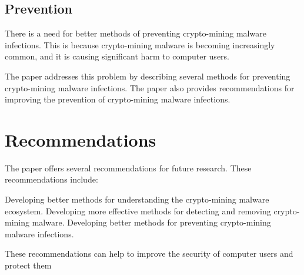 \documentclass[sigconf]{acmart}
\begin{document}
\subsection{Prevention}

There is a need for better methods of preventing crypto-mining malware infections. This is because crypto-mining malware is becoming increasingly common, and it is causing significant harm to computer users.

The paper addresses this problem by describing several methods for preventing crypto-mining malware infections. The paper also provides recommendations for improving the prevention of crypto-mining malware infections.

\section{Recommendations}

The paper offers several recommendations for future research. These recommendations include:

    Developing better methods for understanding the crypto-mining malware ecosystem.
    Developing more effective methods for detecting and removing crypto-mining malware.
    Developing better methods for preventing crypto-mining malware infections.

These recommendations can help to improve the security of computer users and protect them
\end{document}
